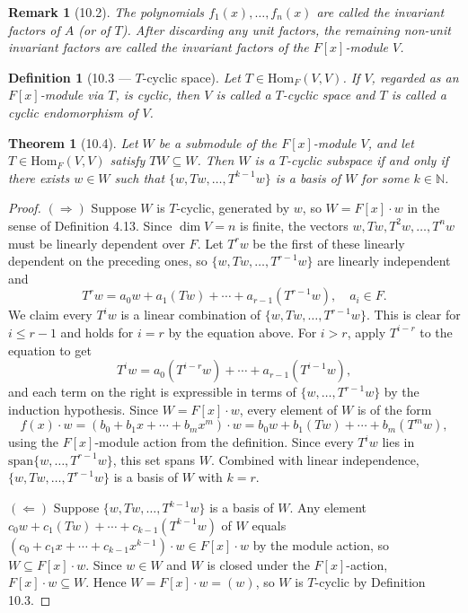 \documentclass[12pt]{article}
\newtheorem{theorem}{Theorem}
\newtheorem{definition}{Definition}
\newtheorem{remark}{Remark}
\begin{document}
\begin{remark}[10.2]
The polynomials $f_1(x), \ldots, f_n(x)$ are called the \emph{invariant factors} of $A$ (or of $T$). After discarding any unit factors, the remaining non-unit invariant factors are called the invariant factors of the $F[x]$-module $V$.
\end{remark}

\begin{definition}[10.3 — $T$-cyclic space]
Let $T \in \mathrm{Hom}_F(V,V)$. If $V$, regarded as an $F[x]$-module via $T$, is cyclic, then $V$ is called a \emph{$T$-cyclic space} and $T$ is called a \emph{cyclic endomorphism} of $V$.
\end{definition}

\begin{theorem}[10.4]
Let $W$ be a submodule of the $F[x]$-module $V$, and let $T \in \mathrm{Hom}_F(V,V)$ satisfy $TW \subseteq W$. Then $W$ is a $T$-cyclic subspace if and only if there exists $w \in W$ such that $\{w, Tw, \ldots, T^{k-1}w\}$ is a basis of $W$ for some $k \in \mathbb{N}$.
\end{theorem}

\begin{proof}
$(\Rightarrow)$ Suppose $W$ is $T$-cyclic, generated by $w$, so $W = F[x] \cdot w$ in the sense of Definition 4.13. Since $\dim V = n$ is finite, the vectors $w, Tw, T^2w, \ldots, T^nw$ must be linearly dependent over $F$. Let $T^rw$ be the first of these linearly dependent on the preceding ones, so $\{w, Tw, \ldots, T^{r-1}w\}$ are linearly independent and
\[
  T^rw = a_0w + a_1(Tw) + \cdots + a_{r-1}(T^{r-1}w), \quad a_i \in F.
\]
We claim every $T^iw$ is a linear combination of $\{w, Tw, \ldots, T^{r-1}w\}$. This is clear for $i \leq r-1$ and holds for $i = r$ by the equation above. For $i > r$, apply $T^{i-r}$ to the equation to get
\[
  T^iw = a_0(T^{i-r}w) + \cdots + a_{r-1}(T^{i-1}w),
\]
and each term on the right is expressible in terms of $\{w, \ldots, T^{r-1}w\}$ by the induction hypothesis. Since $W = F[x] \cdot w$, every element of $W$ is of the form
\[
  f(x) \cdot w = (b_0 + b_1 x + \cdots + b_m x^m) \cdot w = b_0w + b_1(Tw) + \cdots + b_m(T^mw),
\]
using the $F[x]$-module action from the definition. Since every $T^iw$ lies in $\mathrm{span}\{w, \ldots, T^{r-1}w\}$, this set spans $W$. Combined with linear independence, $\{w, Tw, \ldots, T^{r-1}w\}$ is a basis of $W$ with $k = r$.

$(\Leftarrow)$ Suppose $\{w, Tw, \ldots, T^{k-1}w\}$ is a basis of $W$. Any element $c_0w + c_1(Tw) + \cdots + c_{k-1}(T^{k-1}w)$ of $W$ equals $(c_0 + c_1x + \cdots + c_{k-1}x^{k-1}) \cdot w \in F[x] \cdot w$ by the module action, so $W \subseteq F[x] \cdot w$. Since $w \in W$ and $W$ is closed under the $F[x]$-action, $F[x] \cdot w \subseteq W$. Hence $W = F[x] \cdot w = (w)$, so $W$ is $T$-cyclic by Definition 10.3.
\end{proof}
\end{document}
